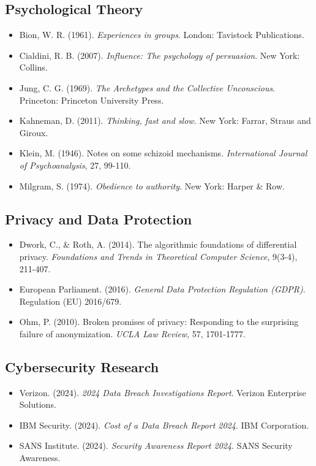 \documentclass[11pt,a4paper]{article}
\begin{document}
\subsection{Psychological Theory}

\begin{itemize}
\item Bion, W. R. (1961). \textit{Experiences in groups}. London: Tavistock Publications.
\item Cialdini, R. B. (2007). \textit{Influence: The psychology of persuasion}. New York: Collins.
\item Jung, C. G. (1969). \textit{The Archetypes and the Collective Unconscious}. Princeton: Princeton University Press.
\item Kahneman, D. (2011). \textit{Thinking, fast and slow}. New York: Farrar, Straus and Giroux.
\item Klein, M. (1946). Notes on some schizoid mechanisms. \textit{International Journal of Psychoanalysis}, 27, 99-110.
\item Milgram, S. (1974). \textit{Obedience to authority}. New York: Harper \& Row.
\end{itemize}

\subsection{Privacy and Data Protection}

\begin{itemize}
\item Dwork, C., \& Roth, A. (2014). The algorithmic foundations of differential privacy. \textit{Foundations and Trends in Theoretical Computer Science}, 9(3-4), 211-407.
\item European Parliament. (2016). \textit{General Data Protection Regulation (GDPR)}. Regulation (EU) 2016/679.
\item Ohm, P. (2010). Broken promises of privacy: Responding to the surprising failure of anonymization. \textit{UCLA Law Review}, 57, 1701-1777.
\end{itemize}

\subsection{Cybersecurity Research}

\begin{itemize}
\item Verizon. (2024). \textit{2024 Data Breach Investigations Report}. Verizon Enterprise Solutions.
\item IBM Security. (2024). \textit{Cost of a Data Breach Report 2024}. IBM Corporation.
\item SANS Institute. (2024). \textit{Security Awareness Report 2024}. SANS Security Awareness.
\end{itemize}
\end{document}

